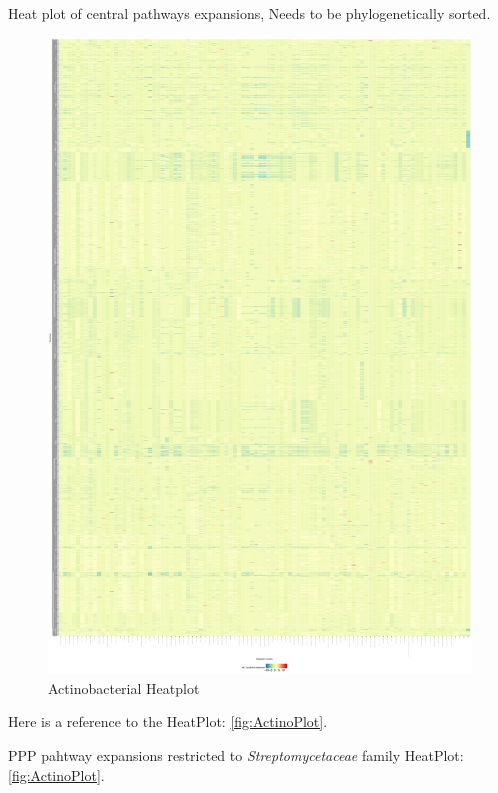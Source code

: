 \documentclass[12pt,twoside]{reedthesis}
\begin{document}
  Heat plot of central pathways expansions, Needs to be phylogenetically
  sorted.
  
  \begin{figure}[h!tbp]
  \centering
  \includegraphics[angle = 0,scale = 0.7]{chapter4/HeatPlotActinos.pdf}
  \caption[Actinobacterial Heatplot]{\normalsize{Actinobacterial Heatplot}}
  \label{fig:ActinoPlot}
  \end{figure}
  
  Here is a reference to the HeatPlot: \autoref{fig:ActinoPlot}.
  \clearpage 
  
  PPP pahtway expansions restricted to \emph{Streptomycetaceae} family
  HeatPlot: \autoref{fig:ActinoPlot}.
  
\end{document}
